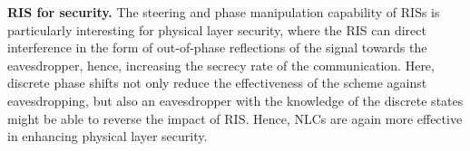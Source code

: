 \textbf{RIS for security.} The steering and phase manipulation capability of \glspl{RIS} is particularly interesting for physical layer security, where the \gls{RIS} can direct interference in the form of out-of-phase reflections of the signal towards the eavesdropper, hence, increasing the secrecy rate of the communication. Here, discrete phase shifts not only reduce the effectiveness of the scheme against eavesdropping, but also an eavesdropper with the knowledge of the discrete states might be able to reverse the impact of \gls{RIS}. Hence, \glspl{NLC} are again more effective in enhancing physical layer security. 


